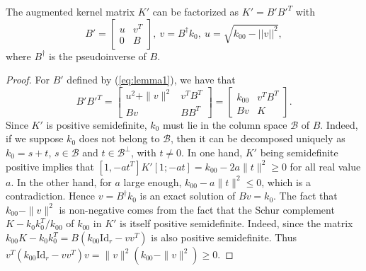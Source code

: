 \begin{lemma} The augmented kernel matrix $K'$ can be factorized as $K'= B'B'^T$ with
\begin{equation}
B'=\begin{bmatrix}
u & v^T\\0 & B
\end{bmatrix},~
v = B^\dagger k_0,~ u=\sqrt{k_{00}-||v||^2},
\label{eq:lemma1}
\end{equation}
where $B^\dagger$ is the pseudoinverse of $B$.
\end{lemma}\label{lemma1}
\begin{proof}
For $B'$ defined by (\ref{eq:lemma1}), we have that
\begin{equation}
B'B'^T = 
\begin{bmatrix} u^2+\|v\|^2 & v^TB^T\\ 
Bv& BB^T\end{bmatrix} 
=\begin{bmatrix} k_{00} & v^TB^T\\ 
Bv& K\end{bmatrix} .
\end{equation}
Since $K'$ is positive semidefinite, $k_0$ must lie in the column space $\mathcal{B}$ of $B$.
Indeed, if we suppose $k_0$ does not belong to $\mathcal{B}$, then it can be decomposed uniquely as $k_0=s+t$, $s\in\mathcal{B}$ and  $t\in\mathcal{B}^\perp$, with $t\ne 0$. In one hand, $K'$ being semidefinite positive implies that $[1, -at^T]K'[1; -at]=k_{00}-2a\|t\|^2\ge 0$ for all real value $a$. In the other hand, for $a$ large enough, $k_{00}-a\|t\|^2\le 0$, which is a contradiction.
Hence $v=B^\dagger k_0$ is an exact solution of $Bv=k_0$. The fact that $k_{00}-\|v\|^2$ is non-negative comes from the fact that the Schur complement $K-k_0 k_0^T / k_{00}$ of $k_{00}$ in $K'$ is itself positive semidefinite.
Indeed, since the matrix $k_{00}K-k_0k_0^T=B(k_{00}\mathrm{Id}_r-vv^T)$ is also positive semidefinite. Thus $v^T(k_{00}\mathrm{Id}_r-vv^T)v = \|v\|^2(k_{00}-\|v\|^2)\ge 0$. \qedhere
\end{proof}


